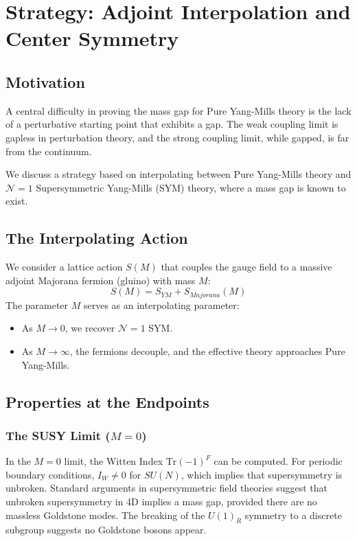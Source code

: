 \section{Strategy: Adjoint Interpolation and Center Symmetry}
\label{sec:adjoint}

\subsection{Motivation}
A central difficulty in proving the mass gap for Pure Yang-Mills theory is the lack of a perturbative starting point that exhibits a gap. The weak coupling limit is gapless in perturbation theory, and the strong coupling limit, while gapped, is far from the continuum.

We discuss a strategy based on interpolating between Pure Yang-Mills theory and $\mathcal{N}=1$ Supersymmetric Yang-Mills (SYM) theory, where a mass gap is known to exist.

\subsection{The Interpolating Action}
We consider a lattice action $S(M)$ that couples the gauge field to a massive adjoint Majorana fermion (gluino) with mass $M$:
\begin{equation}
S(M) = S_{YM} + S_{Majorana}(M)
\end{equation}
The parameter $M$ serves as an interpolating parameter:
\begin{itemize}
    \item As $M \to 0$, we recover $\mathcal{N}=1$ SYM.
    \item As $M \to \infty$, the fermions decouple, and the effective theory approaches Pure Yang-Mills.
\end{itemize}

\subsection{Properties at the Endpoints}
\subsubsection{The SUSY Limit ($M=0$)}
In the $M=0$ limit, the Witten Index $\text{Tr}(-1)^F$ can be computed. For periodic boundary conditions, $I_W \neq 0$ for $SU(N)$, which implies that supersymmetry is unbroken. Standard arguments in supersymmetric field theories suggest that unbroken supersymmetry in 4D implies a mass gap, provided there are no massless Goldstone modes. The breaking of the $U(1)_R$ symmetry to a discrete subgroup suggests no Goldstone bosons appear.

